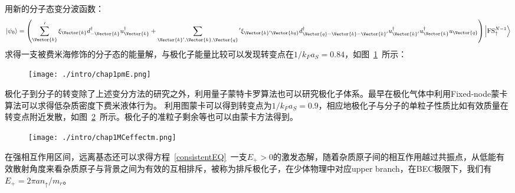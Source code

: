 用新的分子态变分波函数：
\begin{equation}
\left|\psi_{0}\right\rangle=\left(\sum_{\Vector{k}}^{\prime} \xi_{\Vector{k}} d_{-\Vector{k}}^{\dagger} u_{\Vector{k}}^{\dagger}+\sum_{\Vector{k}^{\prime}, \Vector{k}, \Vector{q}}{ }^{\prime} \xi_{\Vector{k}^{\prime} \Vector{k q}} d_{\Vector{q}-\Vector{k}-\Vector{k}^{\prime}}^{\dagger} u_{\Vector{k}^{\prime}}^{\dagger} u_{\Vector{k}}^{\dagger} u_{\Vector{q}}\right)\left|\mathrm{FS}_{\uparrow}^{N-1}\right\rangle
\end{equation}
求得一支被费米海修饰的分子态的能量解，与极化子能量比较可以发现转变点在$1/k_Fa_S=0.84$，如图~\ref{pmE}~所示：
\begin{figure}[!htbp]
    \centering
    \texttt{[image: ./intro/chap1pmE.png]}
    \label{pmE}
\end{figure}
极化子到分子的转变除了上述变分方法的研究之外，利用量子蒙特卡罗算法也可以研究极化子体系。最早在极化气体中利用Fixed-node蒙卡算法可以求得低杂质密度下费米液体行为\cite{Pilati2008phase}。 利用图蒙卡可以得到转变点为$1/k_Fa_S=0.9$，相应地极化子与分子的单粒子性质比如有效质量在转变点附近发散，如图~\ref{MCeffectm}~所示。极化子的准粒子剩余等也可以由蒙卡方法得到\cite{Prokoffermi,Prokofbold,VlietinckMC}。
\begin{figure}[!htbp]
    \centering
    \texttt{[image: ./intro/chap1MCeffectm.png]}
    \label{MCeffectm}
\end{figure}
在强相互作用区间，远离基态还可以求得方程~\ref{consistentEQ}~一支$E_+>0$的激发态解，随着杂质原子间的相互作用越过共振点，从低能有效散射角度来看杂质原子与背景之间为有效的互相排斥，被称为排斥极化子\cite{Cui2010Stability}，在少体物理中对应upper branch，在BEC极限下，我们有$E_{+}=2 \pi a n_{\uparrow} / m_{r}$。

